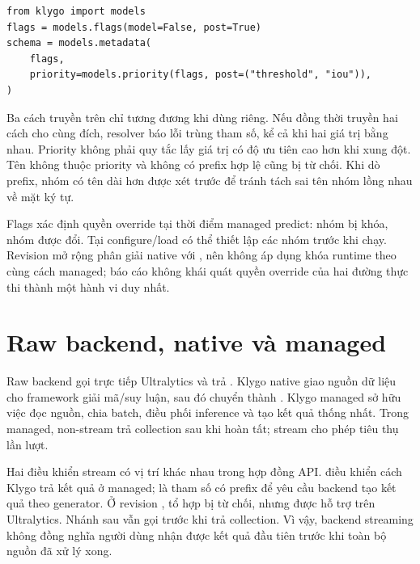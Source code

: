 \noindent\begin{minipage}{\linewidth}
\begin{lstlisting}[caption={Khai báo nhóm, tên ngắn và quyền cập nhật}]
from klygo import models
flags = models.flags(model=False, post=True)
schema = models.metadata(
    flags,
    priority=models.priority(flags, post=("threshold", "iou")),
)
\end{lstlisting}
\vspace{4pt}
\end{minipage}
Ba cách truyền trên chỉ tương đương khi dùng riêng. Nếu đồng thời truyền hai cách cho cùng đích, resolver báo lỗi trùng tham số, kể cả khi hai giá trị bằng nhau. Priority không phải quy tắc lấy giá trị có độ ưu tiên cao hơn khi xung đột. Tên không thuộc priority và không có prefix hợp lệ cũng bị từ chối. Khi dò prefix, nhóm có tên dài hơn được xét trước để tránh tách sai tên nhóm lồng nhau về mặt ký tự.

Flags xác định quyền override tại thời điểm managed predict: nhóm  bị khóa, nhóm  được đổi. Tại configure/load có thể thiết lập các nhóm trước khi chạy. Revision mở rộng phân giải native với , nên không áp dụng khóa runtime theo cùng cách managed; báo cáo không khái quát quyền override của hai đường thực thi thành một hành vi duy nhất.

\section{Raw backend, native và managed}
Raw backend gọi trực tiếp Ultralytics và trả . Klygo native giao nguồn dữ liệu cho framework giải mã/suy luận, sau đó chuyển thành . Klygo managed sở hữu việc đọc nguồn, chia batch, điều phối inference và tạo kết quả thống nhất. Trong managed, non-stream trả collection sau khi hoàn tất; stream cho phép tiêu thụ lần lượt.

Hai điều khiển stream có vị trí khác nhau trong hợp đồng API.  điều khiển cách Klygo trả kết quả ở managed;  là tham số có prefix để yêu cầu backend tạo kết quả theo generator. Ở revision , tổ hợp  bị từ chối, nhưng  được hỗ trợ trên Ultralytics. Nhánh sau vẫn gọi  trước khi trả collection. Vì vậy, backend streaming không đồng nghĩa người dùng nhận được kết quả đầu tiên trước khi toàn bộ nguồn đã xử lý xong.

